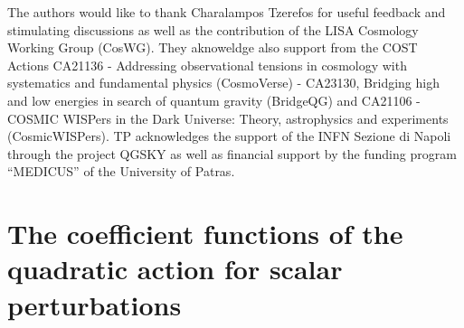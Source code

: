 \documentclass[nofootinbib,aps,a4paper,letterpaper,superscriptaddress,
twocolumn,times]{revtex4}
\renewcommand{\(}{\left(}
\renewcommand{\)}{\right)}
\renewcommand{\(}{\left(}
\renewcommand{\)}{\right)}
\renewcommand{\[}{\left[}
\renewcommand{\]}{\right]}
\begin{document}
\begin{acknowledgments} 
The authors would like to thank Charalampos Tzerefos for useful feedback and stimulating discussions as well as the 
contribution of 
the LISA Cosmology Working Group (CosWG). They aknoweldge also support from the COST 
Actions CA21136 -  Addressing observational tensions in cosmology with 
systematics and fundamental physics (CosmoVerse)  - CA23130, Bridging 
high and low energies in search of quantum gravity (BridgeQG)  and CA21106 -  
 COSMIC WISPers in the Dark Universe: Theory, astrophysics and 
experiments (CosmicWISPers). TP acknowledges the support of the INFN Sezione di Napoli through the project QGSKY as 
well as financial support by the funding program “MEDICUS” of the University of Patras. 
\end{acknowledgments}


\appendix 

\section{The coefficient functions of  
the quadratic action for  scalar perturbations
}\label{A}
\end{document}
